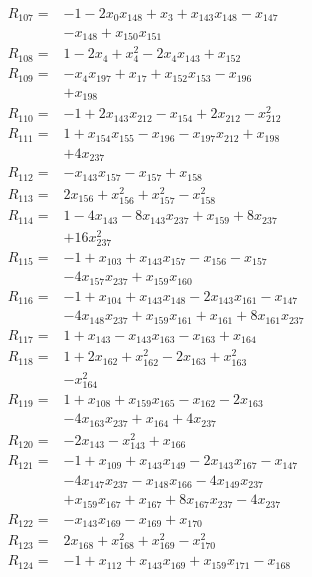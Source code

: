 \begin{align*}
R_{107}={}&-1 -2x_{0}x_{148} +x_{3} +x_{143}x_{148} -x_{147}\\
&-x_{148} +x_{150}x_{151}\\[3pt]
R_{108}={}&1 -2x_{4} +x_{4}^{2} -2x_{4}x_{143} +x_{152}\\[3pt]
R_{109}={}&-x_{4}x_{197} +x_{17} +x_{152}x_{153} -x_{196}\\
&+x_{198}\\[3pt]
R_{110}={}&-1 +2x_{143}x_{212} -x_{154} +2x_{212} -x_{212}^{2}\\[3pt]
R_{111}={}&1 +x_{154}x_{155} -x_{196} -x_{197}x_{212} +x_{198}\\
&+4x_{237}\\[3pt]
R_{112}={}&-x_{143}x_{157} -x_{157} +x_{158}\\[3pt]
R_{113}={}&2x_{156} +x_{156}^{2} +x_{157}^{2} -x_{158}^{2}\\[3pt]
R_{114}={}&1 -4x_{143} -8x_{143}x_{237} +x_{159} +8x_{237}\\
&+16x_{237}^{2}\\[3pt]
R_{115}={}&-1 +x_{103} +x_{143}x_{157} -x_{156} -x_{157}\\
&-4x_{157}x_{237} +x_{159}x_{160}\\[3pt]
R_{116}={}&-1 +x_{104} +x_{143}x_{148} -2x_{143}x_{161} -x_{147}\\
&-4x_{148}x_{237} +x_{159}x_{161} +x_{161} +8x_{161}x_{237}\\[3pt]
R_{117}={}&1 +x_{143} -x_{143}x_{163} -x_{163} +x_{164}\\[3pt]
R_{118}={}&1 +2x_{162} +x_{162}^{2} -2x_{163} +x_{163}^{2}\\
&-x_{164}^{2}\\[3pt]
R_{119}={}&1 +x_{108} +x_{159}x_{165} -x_{162} -2x_{163}\\
&-4x_{163}x_{237} +x_{164} +4x_{237}\\[3pt]
R_{120}={}&-2x_{143} -x_{143}^{2} +x_{166}\\[3pt]
R_{121}={}&-1 +x_{109} +x_{143}x_{149} -2x_{143}x_{167} -x_{147}\\
&-4x_{147}x_{237} -x_{148}x_{166} -4x_{149}x_{237}\\
&+x_{159}x_{167} +x_{167} +8x_{167}x_{237} -4x_{237}\\[3pt]
R_{122}={}&-x_{143}x_{169} -x_{169} +x_{170}\\[3pt]
R_{123}={}&2x_{168} +x_{168}^{2} +x_{169}^{2} -x_{170}^{2}\\[3pt]
R_{124}={}&-1 +x_{112} +x_{143}x_{169} +x_{159}x_{171} -x_{168}\\

\end{align*}
